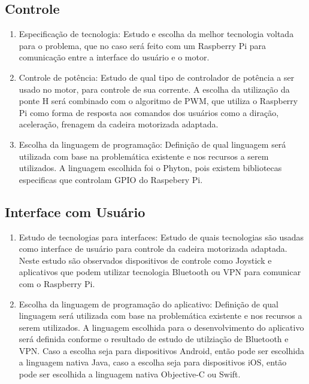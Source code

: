     \subsection{Controle}
      \begin{enumerate}
        \item Especificação de tecnologia: Estudo e escolha da melhor tecnologia voltada para o problema, que no caso será feito com um Raspberry Pi para comunicação entre a interface do usuário e o motor.

        \item Controle de potência: Estudo de qual tipo de controlador de potência a ser usado no motor, para controle de sua corrente. A escolha da utilização da ponte H será combinado com o algoritmo de PWM, que utiliza o Raspberry Pi como forma de resposta aos comandos dos usuários como a diração, aceleração, frenagem da cadeira motorizada adaptada.

        \item Escolha da linguagem de programação: Definição de qual linguagem será utilizada com base na problemática existente e nos recursos a serem utilizados. A linguagem escolhida foi o Phyton, pois existem bibliotecas especificas que controlam GPIO do Raspebery Pi.

      \end{enumerate}

  \subsection{Interface com Usuário}
    \begin{enumerate}
      \item Estudo de tecnologias para interfaces: Estudo de quais tecnologias são usadas como interface de usuário para controle da cadeira motorizada adaptada. Neste estudo são observados dispositivos de controle como Joystick e aplicativos que podem utilizar tecnologia Bluetooth ou VPN para comunicar com o Raspberry Pi.

      \item Escolha da linguagem de programação do aplicativo: Definição de qual linguagem será utilizada com base na problemática existente e nos recursos a serem utilizados. A linguagem escolhida para o desenvolvimento do aplicativo será definida conforme o resultado de estudo de utilziação de Bluetooth e VPN. Caso a escolha seja para dispositivos Android, então pode ser escolhida a linguagem nativa Java, caso a escolha seja para dispositivos iOS, então pode ser escolhida a linguagem nativa Objective-C ou Swift.

    \end{enumerate}

